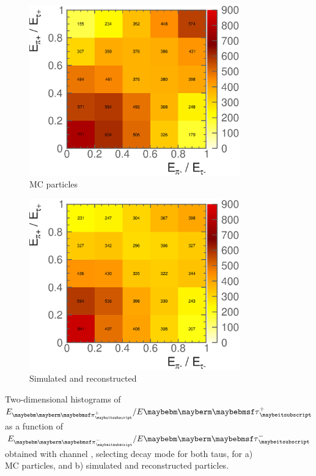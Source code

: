 \begin{figure}[htbp]
\centering %
\begin{subfigure}[b]{0.75\textwidth}
  \includegraphics[width=\textwidth]{tau/NoTimeAnalysis/2DMC}
  \caption{MC particles}
  \label{fig:TauSpin2DMC}
\end{subfigure}
\begin{subfigure}[b]{0.75\textwidth}
  \includegraphics[width=\textwidth]{tau/NoTimeAnalysis/2Dreco}
  \caption{Simulated and reconstructed}
  \label{fig:TauSpin2Dreco}
\end{subfigure}
\caption
{Two-dimensional histograms of $E_{\Ppiplus}/E{\APtauon}$ as a function of $E_{\Ppiminus}/E{\Ptauon}$ obtained with  \ZToTauTau channel , selecting \tauToPion decay mode for both taus, for a) MC particles, and b) simulated and reconstructed particles.}
\label{fig:TauSpin2D}
\end{figure}
